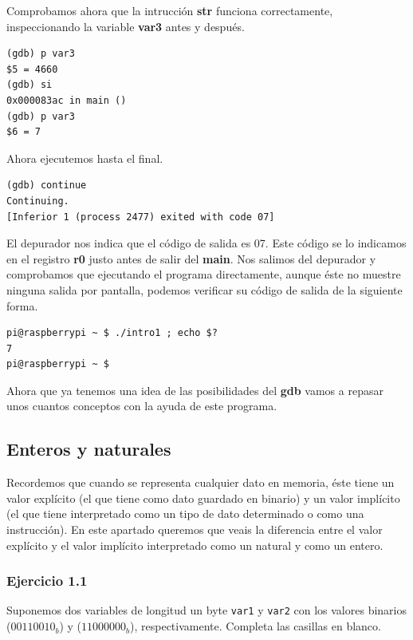 Comprobamos ahora que la intrucción {\bf str} funciona correctamente,
inspeccionando la variable {\bf var3} antes y después.

\begin{lstlisting}
(gdb) p var3
$5 = 4660
(gdb) si
0x000083ac in main ()
(gdb) p var3
$6 = 7
\end{lstlisting}

Ahora ejecutemos hasta el final.

\begin{lstlisting}
(gdb) continue
Continuing.
[Inferior 1 (process 2477) exited with code 07]
\end{lstlisting}

El depurador nos indica que el código de salida es 07. Este código
se lo indicamos en el registro {\bf r0} justo antes de salir del {\bf main}.
Nos salimos del depurador y comprobamos que ejecutando el programa
directamente, aunque éste no muestre ninguna salida por pantalla, podemos
verificar su código de salida de la siguiente forma.

\begin{lstlisting}
pi@raspberrypi ~ $ ./intro1 ; echo $?
7
pi@raspberrypi ~ $
\end{lstlisting}

Ahora que ya tenemos una idea de las posibilidades del {\bf gdb}
vamos a repasar unos cuantos conceptos con la ayuda de este programa.

\subsection{Enteros y naturales}

Recordemos que cuando se representa cualquier dato en memoria, éste tiene un
valor explícito (el que tiene como dato guardado en binario) y un
valor implícito (el que tiene interpretado como un tipo de dato
determinado o como una instrucción). En este apartado queremos que veais la
diferencia entre el valor explícito y el valor implícito interpretado como
un natural y como un entero.

\subsubsection{Ejercicio 1.1}
Suponemos dos variables de longitud un byte {\tt var1}
y {\tt var2} con los valores binarios ($00110010_b$) y ($11000000_b$),
respectivamente. Completa las casillas en blanco.

